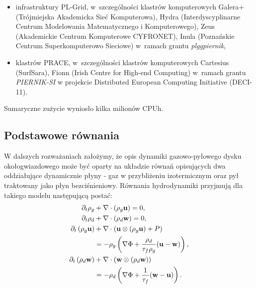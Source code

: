 \begin{itemize}
   \item infrastruktury PL-Grid, w~szczególności klastrów
      komputerowych Galera+ (Trójmiejska Akademicka Sieć Komputerowa), Hydra
      (Interdyscyplinarne Centrum Modelowania Matematycznego i Komputerowego),
      Zeus (Akademickie Centrum Komputerowe CYFRONET), Inula (Poznańskie Centrum
      Superkomputerowo Sieciowe) w~ramach grantu \emph{plggpiernik},

   \item klastrów PRACE, w~szczególności klastrów komputerowych
      Cartesius (SurfSara), Fionn (Irish Centre for High-end Computing) w~ramach grantu \emph{PIERNIK-SI} w
      projekcie Distributed European Computing Initiative (DECI-11).
\end{itemize}
Sumaryczne zużycie wyniosło kilka milionów CPUh.




\subsection{Podstawowe równania}
W dalszych rozważaniach założymy, że opis dynamiki gazowo-pyłowego dysku
okołogwiazdowego może być oparty na układzie równań opisujących dwa oddziałujące
dynamicznie płyny - gaz w przybliżeniu izotermicznym oraz  pył traktowany jako
płyn bezciśnieniowy. Równania hydrodynamiki przyjmują dla takiego modelu
następującą postać:
%
\begin{align}
   \partial_t \rho_g &+ \nabla\cdot\left(\rho_g\mathbf{u}\right) = 0,\label{eq1}\\
   \partial_t \rho_d &+ \nabla\cdot\left(\rho_d\mathbf{w}\right) = 0,\label{eq2}\\
\partial_t \left(\rho_g\mathbf{u}\right) &+
   \nabla\cdot(\mathbf{u}\otimes(\rho_g\mathbf{u})+P) \notag\\
 &= -\rho_g\left(\nabla\Phi +
\frac{\rho_d}{\tau_f\rho_g}(\mathbf{u}-\mathbf{w})\right),\label{eq3}\\
\partial_t \left(\rho_d\mathbf{w}\right) &+
\nabla\cdot(\mathbf{w}\otimes(\rho_d\mathbf{w})) \notag\\
 &= -\rho_d\left(\nabla\Phi + \frac{1}{\tau_f}(\mathbf{w}-\mathbf{u})\right)
\label{eq4}.
\end{align}

